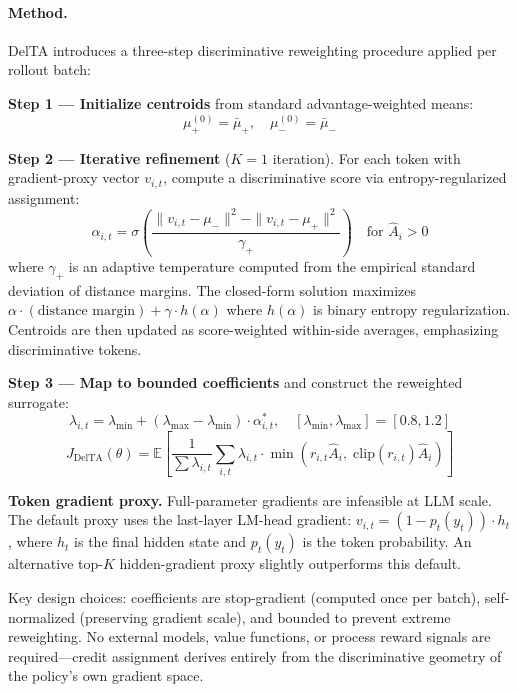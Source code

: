 \documentclass[11pt,a4paper]{article}
\begin{document}
\paragraph{Method.}
DelTA introduces a three-step discriminative reweighting procedure applied per rollout batch:

\textbf{Step 1 --- Initialize centroids} from standard advantage-weighted means:
\begin{equation}
    \mu_+^{(0)} = \bar{\mu}_+, \quad \mu_-^{(0)} = \bar{\mu}_-
\end{equation}

\textbf{Step 2 --- Iterative refinement} ($K=1$ iteration). For each token with gradient-proxy vector $v_{i,t}$, compute a discriminative score via entropy-regularized assignment:
\begin{equation}
    \alpha_{i,t} = \sigma\!\left(\frac{\|v_{i,t} - \mu_-\|^2 - \|v_{i,t} - \mu_+\|^2}{\gamma_+}\right) \quad \text{for } \hat{A}_i > 0
\end{equation}
where $\gamma_+$ is an adaptive temperature computed from the empirical standard deviation of distance margins. The closed-form solution maximizes $\alpha \cdot (\text{distance margin}) + \gamma \cdot h(\alpha)$ where $h(\alpha)$ is binary entropy regularization. Centroids are then updated as score-weighted within-side averages, emphasizing discriminative tokens.

\textbf{Step 3 --- Map to bounded coefficients} and construct the reweighted surrogate:
\begin{equation}
    \lambda_{i,t} = \lambda_{\min} + (\lambda_{\max} - \lambda_{\min}) \cdot \alpha^*_{i,t}, \quad [\lambda_{\min}, \lambda_{\max}] = [0.8, 1.2]
\end{equation}
\begin{equation}
    J_{\mathrm{DelTA}}(\theta) = \mathbb{E}\left[\frac{1}{\sum \lambda_{i,t}} \sum_{i,t} \lambda_{i,t} \cdot \min\!\left(r_{i,t} \hat{A}_i,\; \mathrm{clip}(r_{i,t}) \hat{A}_i\right)\right]
\end{equation}

\textbf{Token gradient proxy.} Full-parameter gradients are infeasible at LLM scale. The default proxy uses the last-layer LM-head gradient: $v_{i,t} = (1 - p_t(y_t)) \cdot h_t$, where $h_t$ is the final hidden state and $p_t(y_t)$ is the token probability. An alternative top-$K$ hidden-gradient proxy slightly outperforms this default.

Key design choices: coefficients are stop-gradient (computed once per batch), self-normalized (preserving gradient scale), and bounded to prevent extreme reweighting. No external models, value functions, or process reward signals are required---credit assignment derives entirely from the discriminative geometry of the policy's own gradient space.
\end{document}
